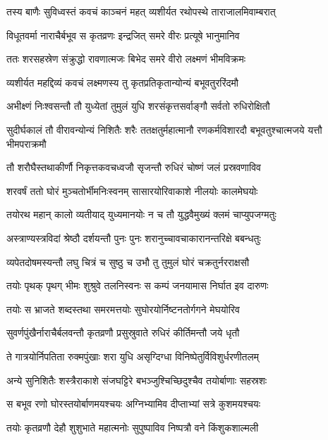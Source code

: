 \twolineshloka
{तस्य बाणैः सुविध्वस्तं कवचं काञ्चनं महत्}
{व्यशीर्यत रथोपस्थे ताराजालमिवाम्बरात्} %

\twolineshloka
{विधूतवर्मा नाराचैर्बभूव स कृतव्रणः}
{इन्द्रजित् समरे वीरः प्रत्यूषे भानुमानिव} %

\twolineshloka
{ततः शरसहस्रेण संक्रुद्धो रावणात्मजः}
{बिभेद समरे वीरो लक्ष्मणं भीमविक्रमः} %

\twolineshloka
{व्यशीर्यत महद्दिव्यं कवचं लक्ष्मणस्य तु}
{कृतप्रतिकृतान्योन्यं बभूवतुररिंदमौ} %

\twolineshloka
{अभीक्ष्णं निःश्वसन्तौ तौ युध्येतां तुमुलं युधि}
{शरसंकृत्तसर्वाङ्गौ सर्वतो रुधिरोक्षितौ} %

\threelineshloka
{सुदीर्घकालं तौ वीरावन्योन्यं निशितैः शरैः}
{ततक्षतुर्महात्मानौ रणकर्मविशारदौ}
{बभूवतुश्चात्मजये यत्तौ भीमपराक्रमौ} %

\twolineshloka
{तौ शरौघैस्तथाकीर्णौ निकृत्तकवचध्वजौ}
{सृजन्तौ रुधिरं चोष्णं जलं प्रस्रवणाविव} %

\twolineshloka
{शरवर्षं ततो घोरं मुञ्चतोर्भीमनिःस्वनम्}
{सासारयोरिवाकाशे नीलयोः कालमेघयोः} %

\twolineshloka
{तयोरथ महान् कालो व्यतीयाद् युध्यमानयोः}
{न च तौ युद्धवैमुख्यं क्लमं चाप्युपजग्मतुः} %

\twolineshloka
{अस्त्राण्यस्त्रविदां श्रेष्ठौ दर्शयन्तौ पुनः पुनः}
{शरानुच्चावचाकारानन्तरिक्षे बबन्धतुः} %

\twolineshloka
{व्यपेतदोषमस्यन्तौ लघु चित्रं च सुष्ठु च}
{उभौ तु तुमुलं घोरं चक्रतुर्नरराक्षसौ} %

\twolineshloka
{तयोः पृथक् पृथग् भीमः शुश्रुवे तलनिस्वनः}
{स कम्पं जनयामास निर्घात इव दारुणः} %

\twolineshloka
{तयोः स भ्राजते शब्दस्तथा समरमत्तयोः}
{सुघोरयोर्निष्टनतोर्गगने मेघयोरिव} %

\twolineshloka
{सुवर्णपुंखैर्नाराचैर्बलवन्तौ कृतव्रणौ}
{प्रसुस्रुवाते रुधिरं कीर्तिमन्तौ जये धृतौ} %

\twolineshloka
{ते गात्रयोर्निपतिता रुक्मपुंखाः शरा युधि}
{असृग्दिग्धा विनिष्पेतुर्विविशुर्धरणीतलम्} %

\twolineshloka
{अन्ये सुनिशितैः शस्त्रैराकाशे संजघट्टिरे}
{बभञ्जुश्चिच्छिदुश्चैव तयोर्बाणाः सहस्रशः} %

\twolineshloka
{स बभूव रणो घोरस्तयोर्बाणमयश्चयः}
{अग्निभ्यामिव दीप्ताभ्यां सत्रे कुशमयश्चयः} %

\twolineshloka
{तयोः कृतव्रणौ देहौ शुशुभाते महात्मनोः}
{सुपुष्पाविव निष्पत्रौ वने किंशुकशाल्मली} %

